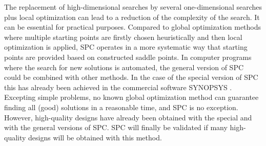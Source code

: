 The replacement of high-dimensional searches by several one-dimensional searches plus local optimization can lead to a reduction of the complexity of the search. It can be essential for practical purposes. Compared to global optimization methods where multiple starting points are firstly chosen heuristically and then local optimization is applied, SPC operates in a more systematic way that starting points are provided based on constructed saddle points. In computer programs where the search for new solutions is automated, the general version of SPC could be combined with other methods. In the case of the special version of SPC this has already been achieved in the commercial software SYNOPSYS \cite{DilworthSP2012}. Excepting simple problems, no known global optimization method can guarantee finding all (good) solutions in a reasonable time, and SPC is no exception. However, high-quality designs have already been obtained with the special \cite{MarinescuSP2008}\cite{BociortPatent2010} and with the general versions \cite{LivshitsSP2014} of SPC. SPC will finally be validated if many high-quality designs will be obtained with this method.




